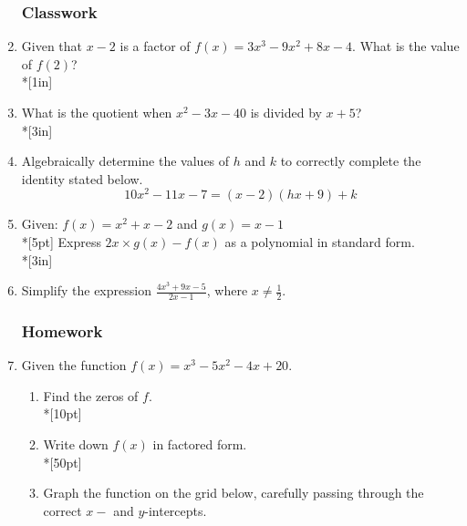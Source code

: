 \documentclass[12pt, oneside]{article}
\begin{document}
\begin{enumerate}
\newpage
\subsubsection*{Classwork}

\item Given that $x-2$ is a factor of $f(x)=3x^3-9x^2+8x-4$. What is the value of $f(2)$? \\*[1in]

\item What is the quotient when $x^2-3x-40$ is divided by $x + 5$?\\*[3in]

\item Algebraically determine the values of $h$ and $k$ to correctly complete the identity stated below.
\[10x^2-11x-7=(x-2)(hx+9)+k\] %

\newpage

\item Given: $f(x)=x^2+ x - 2$ and $g(x)=x-1$\\*[5pt]
Express $2x \times g(x) - f(x)$ as a polynomial in standard form. \\*[3in]


\item Simplify the expression $\displaystyle \frac{4x^3+9x-5}{2x-1}$, where $x \neq \frac{1}{2}$. 

\newpage
\subsubsection*{Homework}

\item Given the function $f(x)=x^3-5x^2-4x+20$. 
\begin{enumerate}
    \item Find the zeros of $f$.\\*[10pt]
    \item Write down $f(x)$ in factored form.\\*[50pt]
    \item Graph the function on the grid below, carefully passing through the correct $x-$ and $y$-intercepts. 
\end{enumerate}
\begin{center}
\end{center}


\end{enumerate}
\end{document}
